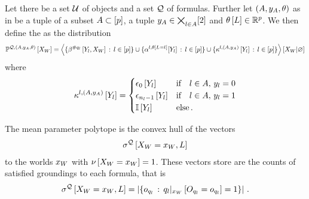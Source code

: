 \begin{definition}
    Let there be a set $\mathcal{U}$ of objects and a set $\mathcal{Q}$ of \firstOrderLogic{} formulas.
    Further let $(A,y_{A},\theta)$ as in  be a tuple of a subset $A\subset[p]$, a tuple $y_{A}\in\bigtimes_{l\in A}[2]$ and $\theta\left[L\right]\in\mathbb{R}^{p}$.
    We then define the \HybridFOLNetwork{} as the distribution
    \begin{align*}
        \mathbb{P}^{\mathcal{Q},(A,y_{A},\theta)}\left[X_{W}\right]
        = \left\langle \{\beta^{\#q_{l}}\left[Y_{l},X_{W}\right]\,:\,l\in[p]\}
        \cup \{\alpha^{l,\theta\left[L_{}=l_{}\right]}[Y_{l}]\,:\,l\in[p]\}
        \cup \{\kappa^{l,(A,y_{A})}\left[Y_{l}\right]\,:\,l\in[p]\}
        \right\rangle \left[ X_{W} | \varnothing \right]
    \end{align*}
    where
    \begin{align*}
        \kappa^{l,(A,y_{A})}\left[Y_{l}\right]
        = \begin{cases}
              \epsilon_0\left[Y_{l}\right] & \text{if}\quad l\in A ,\, y_{l} = 0 \\
              \epsilon_{n_{l}-1}\left[Y_{l}\right] & \text{if}\quad l\in A ,\, y_{l} = 1 \\
              \mathbb{I}\left[Y_{l}\right] & \text{else} \, .
        \end{cases}
    \end{align*}
\end{definition}



The mean parameter polytope is the convex hull of the vectors
\begin{align*}
    \sigma^{\mathcal{Q}}\left[X_{W}=x_{W},L\right]
\end{align*}
to the worlds $x_{W}$ with $\nu\left[X_{W}=x_{W}\right]=1$.
These vectors store are the counts of satisfied groundings to each formula, that is
\begin{align*}
    \sigma^{\mathcal{Q}}\left[X_{W}=x_{W},L\right] = \left|
        \{o_{q_{l}} \,:\, {q_{l}}|_{x_{W}} \left[O_{q_{l}}=o_{q_{l}}\right] = 1 \}
    \right| \, .
\end{align*}

